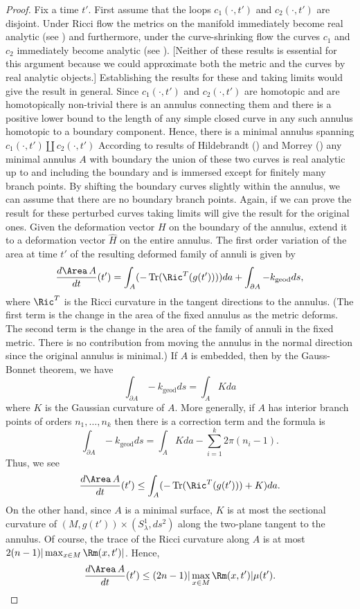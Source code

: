 \begin{proof}
Fix a time $t'$. First assume that the loops $c_1(\cdot,t')$ and
$c_2(\cdot,t')$ are disjoint. Under Ricci flow the metrics on the
manifold immediately become real analytic (see \cite{Bando}) and
furthermore, under the curve-shrinking flow the curves $c_1$ and
$c_2$ immediately become analytic (see \cite{GageHamilton}).
[Neither of these results is essential for this argument because we
could approximate both the metric and the curves by real analytic
objects.] Establishing the results for these and taking limits would
give the result in general. Since $c_1(\cdot,t')$ and
$c_2(\cdot,t')$ are homotopic and are homotopically non-trivial
there is an annulus connecting them and there is a positive lower
bound to the length of any simple closed curve in any such annulus
homotopic to a boundary component. Hence, there is a minimal annulus
spanning $c_1(\cdot,t')\coprod c_2(\cdot, t')$ According to results
of Hildebrandt (\cite{Hildebrandt}) and Morrey (\cite{Morrey}) any
minimal annulus $A$ with boundary the union of these two curves is
real analytic up to and including the boundary and is immersed
except for finitely many branch points. By shifting the boundary
curves slightly within the annulus, we can assume that there are no
boundary branch points. Again, if we can prove the result for these
perturbed curves taking limits will give the result for the original
ones.  Given the deformation vector $H$ on the boundary of the
annulus, extend it to a deformation vector $\hat H$ on the entire
annulus. The first order variation of the area at time $t'$ of the
resulting deformed family of annuli is given by
$$\frac{d \Area\,A}{d t}(t')=\int_{A}(-\operatorname{Tr}(\Ric^T(g(t'))))da
+\int_{\partial A}-k_\mathrm{geod}ds,$$ where $\Ric^T$ is the
Ricci curvature in the tangent directions to the annulus. (The first
term is the change in the area of the fixed annulus as the metric
deforms. The second term is the change in the area of the family of
annuli in the fixed metric. There is no contribution from moving the
annulus in the normal direction since the original annulus is
minimal.)
 If $A$ is embedded, then by the Gauss-Bonnet theorem, we have
$$\int_{\partial A}-k_\mathrm{geod}ds =\int_{A}Kda$$
where $K$ is the Gaussian curvature of $A$. More generally, if $A$
has interior branch points of orders $n_1,\ldots,n_k$ then there is
a correction term and the formula is
$$\int_{\partial A}-k_\mathrm{geod}ds=\int_{A}Kda-\sum_{i=1}^k2\pi(n_i-1).$$ Thus, we see
$$\frac{d \Area\, A}{d t}(t')\le\int_{A}(-\operatorname{Tr}(\Ric^T(g(t')))+K)da.$$
On the other hand, since $A$ is a minimal surface,  $K$ is at most
the sectional curvature of $( M, g(t'))\times (S^1_\lambda,ds^2)$
along the two-plane tangent to the annulus. Of course, the trace of
the Ricci curvature along $A$ is at most $2(n-1)|\max_{x\in
M}\Rm(x,t')|$. Hence,
$$\frac{d\Area\, A}{dt}(t')\le (2n-1)|\max_{x\in M}\Rm(x,t')|\mu(t').$$


\end{proof}
